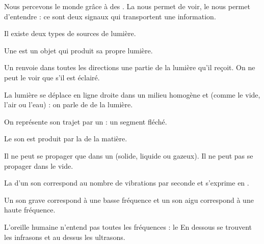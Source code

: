 \documentclass[11pt,a4paper]{article}
\begin{document}
\pagination


Nous percevons le monde grâce à des . La  nous permet de voir, le  nous permet d'entendre : ce sont deux signaux qui transportent une information.



Il existe deux types de sources de lumière.

Une  est un objet qui produit sa propre lumière.


Un  renvoie dans toutes les directions une partie de la lumière qu'il reçoit. On ne peut le voir que s'il est éclairé.



La lumière se déplace en ligne droite dans un milieu homogène et  (comme le vide, l’air ou l’eau) : on parle de  de la lumière.

On représente son trajet par un  : un segment fléché.



Le son est produit par la  de la matière.


Il ne peut se propager que dans un  (solide, liquide ou gazeux). Il ne peut pas se propager dans le vide.


La  d’un son correspond au nombre de vibrations par seconde et s’exprime en .

Un son grave correspond à une basse fréquence et un son aigu correspond à une haute fréquence.

L’oreille humaine n’entend pas toutes les fréquences : le  En dessous se trouvent les infrasons et au dessus les ultrasons.
\end{document}
